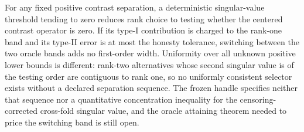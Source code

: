 For any fixed positive contrast separation, a deterministic singular-value threshold tending to zero reduces rank choice to testing whether the centered contrast operator is zero.  If its type-I contribution is charged to the rank-one band and its type-II error is at most the honesty tolerance, switching between the two oracle bands adds no first-order width.  Uniformity over all unknown positive lower bounds is different: rank-two alternatives whose second singular value is of the testing order are contiguous to rank one, so no uniformly consistent selector exists without a declared separation sequence.  The frozen handle specifies neither that sequence nor a quantitative concentration inequality for the censoring-corrected cross-fold singular value, and the oracle attaining theorem needed to price the switching band is still open.